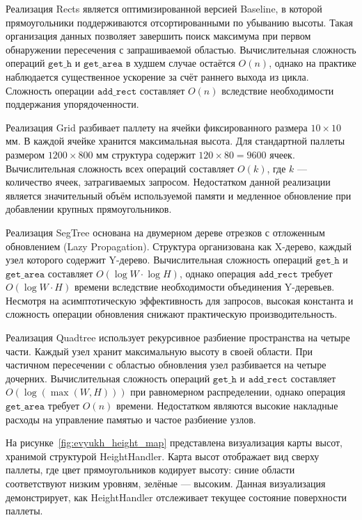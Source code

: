 Реализация Rects является оптимизированной версией Baseline, в которой прямоугольники поддерживаются отсортированными по убыванию высоты. Такая организация данных позволяет завершить поиск максимума при первом обнаружении пересечения с запрашиваемой областью. Вычислительная сложность операций $\mathtt{get\_h}$ и $\mathtt{get\_area}$ в худшем случае остаётся $O(n)$, однако на практике наблюдается существенное ускорение за счёт раннего выхода из цикла. Сложность операции $\mathtt{add\_rect}$ составляет $O(n)$ вследствие необходимости поддержания упорядоченности.

Реализация Grid разбивает паллету на ячейки фиксированного размера $10 \times 10$ мм. В каждой ячейке хранится максимальная высота. Для стандартной паллеты размером $1200 \times 800$ мм структура содержит $120 \times 80 = 9600$ ячеек. Вычислительная сложность всех операций составляет $O(k)$, где $k$ --- количество ячеек, затрагиваемых запросом. Недостатком данной реализации является значительный объём используемой памяти и медленное обновление при добавлении крупных прямоугольников.

Реализация SegTree основана на двумерном дереве отрезков с отложенным обновлением (Lazy Propagation). Структура организована как X-дерево, каждый узел которого содержит Y-дерево. Вычислительная сложность операций $\mathtt{get\_h}$ и $\mathtt{get\_area}$ составляет $O(\log W \cdot \log H)$, однако операция $\mathtt{add\_rect}$ требует $O(\log W \cdot H)$ времени вследствие необходимости объединения Y-деревьев. Несмотря на асимптотическую эффективность для запросов, высокая константа и сложность операции обновления снижают практическую производительность.

Реализация Quadtree использует рекурсивное разбиение пространства на четыре части. Каждый узел хранит максимальную высоту в своей области. При частичном пересечении с областью обновления узел разбивается на четыре дочерних. Вычислительная сложность операций $\mathtt{get\_h}$ и $\mathtt{add\_rect}$ составляет $O(\log(\max(W,H)))$ при равномерном распределении, однако операция $\mathtt{get\_area}$ требует $O(n)$ времени. Недостатком являются высокие накладные расходы на управление памятью и частое разбиение узлов.

На рисунке~\ref{fig:evyukh_height_map} представлена визуализация карты высот, хранимой структурой HeightHandler. Карта высот отображает вид сверху паллеты, где цвет прямоугольников кодирует высоту: синие области соответствуют низким уровням, зелёные --- высоким. Данная визуализация демонстрирует, как HeightHandler отслеживает текущее состояние поверхности паллеты.

